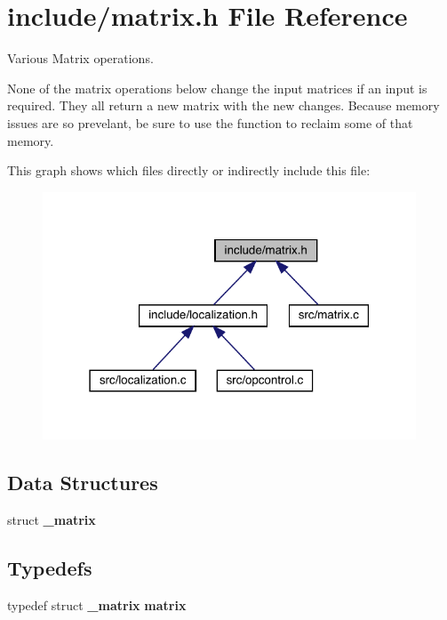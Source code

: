 \section{include/matrix.h File Reference}
\label{matrix_8h}


Various Matrix operations.

None of the matrix operations below change the input matrices if an input is required. They all return a new matrix with the new changes. Because memory issues are so prevelant, be sure to use the  function to reclaim some of that memory.  


This graph shows which files directly or indirectly include this file\+:
\nopagebreak
\begin{figure}[H]
\begin{center}
\leavevmode
\includegraphics[width=315pt]{matrix_8h__dep__incl}
\end{center}
\end{figure}
\subsection*{Data Structures}
\begin{DoxyCompactItemize}
\item 
struct \textbf{ \+\_\+matrix}
\end{DoxyCompactItemize}
\subsection*{Typedefs}
\begin{DoxyCompactItemize}
\item 
typedef struct \textbf{ \+\_\+matrix} \textbf{ matrix}
\end{DoxyCompactItemize}

